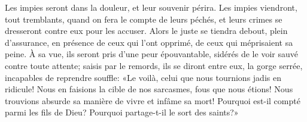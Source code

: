 Les impies seront dans la douleur, et leur souvenir périra.
Les impies viendront, tout tremblants, quand on fera le compte de leurs péchés,
	et leurs crimes se dresseront contre eux pour les accuser.
Alors le juste se tiendra debout, plein d’assurance,
	en présence de ceux qui l’ont opprimé, de ceux qui méprisaient sa peine.
À sa vue, ils seront pris d’une peur épouvantable,
	sidérés de le voir sauvé contre toute attente;
	saisis par le remords, ils se diront entre eux,
		la gorge serrée, incapables de reprendre souffle:
	«Le voilà, celui que nous tournions jadis en ridicule!
Nous en faisions la cible de nos sarcasmes, fous que nous étions!
	Nous trouvions absurde sa manière de vivre et infâme sa mort!
Pourquoi est-il compté parmi les fils de Dieu?
Pourquoi partage-t-il le sort des saints?»
